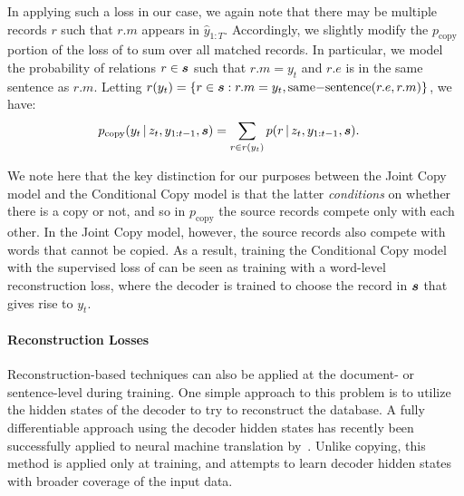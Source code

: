 \documentclass[11pt,letterpaper]{article}
\begin{document}
In applying such a loss in our case, we again note that there may be multiple records $r$ such that $r.m$ appears in $\hat{y}_{1:T}$. Accordingly, we slightly modify the $p_{\mathrm{copy}}$ portion of the loss of \citet{gulcehre2016pointing} to sum over all matched records. In particular, we model the probability of relations $r \in \boldsymbol{s}$ such
that $r.m = y_t$ and $r.e$ is in the same sentence as $r.m$. Letting $r(y_t) = \{ {r\in \boldsymbol{s}: r.m=y_t, \mathrm{same{-}sentence}(r.e, r.m)}  \}$, we have:
\begin{align*}
p_{\text{copy}}(y_t \,|\, z_t,  y_{1:t-1}, \boldsymbol{s}) &= \sum_{r \in r(y_t)} p(r \,|\, z_t,  y_{1:t-1}, \boldsymbol{s}).
\end{align*} 

We note here that the key distinction for our purposes between the Joint Copy model and the Conditional Copy model is that the latter \textit{conditions} on whether there is a copy or not, and so in $p_{\mathrm{copy}}$ the source records compete only with each other. In the Joint Copy model, however, the source records also compete with words that cannot be copied. As a result, training the Conditional Copy model with the supervised loss of \citet{gulcehre2016pointing} can be seen as training with a word-level reconstruction loss, where the decoder is trained to choose the record in $\boldsymbol{s}$ that gives rise to $y_t$.

\paragraph{Reconstruction Losses}

Reconstruction-based techniques can also be applied at the
document- or sentence-level during training. One simple approach to this problem is to
utilize the hidden states of the decoder to try to reconstruct the
database. A fully differentiable approach using the decoder hidden states has recently been
successfully applied to neural machine translation
by~\citet{tu2017neural}. Unlike copying, this method is applied only
at training, and attempts to learn decoder hidden states with broader 
coverage of the input data.
\end{document}
